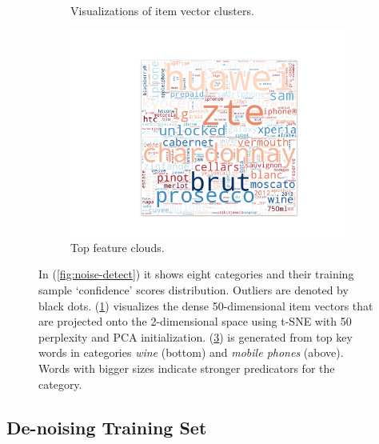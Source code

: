 \begin{figure}[th!]
\begin{subfigure}[b]{0.33\textwidth}
   \caption{Visualizations of item vector clusters.  }
   \label{fig:cluster}
\end{subfigure}
\begin{subfigure}[b]{0.3\textwidth}
   \includegraphics[width=\textwidth]{resources/wc}
   \caption{Top feature clouds.}
   \label{fig:wc}
\end{subfigure}
\caption{In (\ref{fig:noise-detect}) it shows eight categories and their training sample `confidence' scores distribution. Outliers are denoted by black dots. (\ref{fig:cluster}) visualizes the dense 50-dimensional item vectors that are projected onto the 2-dimensional space using t-SNE with 50 perplexity and PCA initialization. (\ref{fig:wc}) is generated from top key words in categories \emph{wine} (bottom) and \emph{mobile phones} (above). Words with bigger sizes indicate stronger predicators for the category.}
\end{figure}

\subsection{De-noising Training Set} %
\label{sub:de_noising_training_sample}

